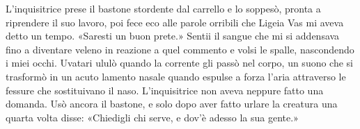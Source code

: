 L'inquisitrice prese il bastone stordente dal carrello e lo soppesò,
pronta a riprendere il suo lavoro, poi fece eco alle parole orribili che
Ligeia Vas mi aveva detto un tempo. «Saresti un buon prete.» Sentii il
sangue che mi si addensava fino a diventare veleno in reazione a quel
commento e volsi le spalle, nascondendo i miei occhi. Uvatari ululò
quando la corrente gli passò nel corpo, un suono che si trasformò in un
acuto lamento nasale quando espulse a forza l'aria attraverso le fessure
che sostituivano il naso. L'inquisitrice non aveva neppure fatto una
domanda. Usò ancora il bastone, e solo dopo aver fatto urlare la
creatura una quarta volta disse: «Chiedigli chi serve, e dov'è adesso la
sua gente.»

